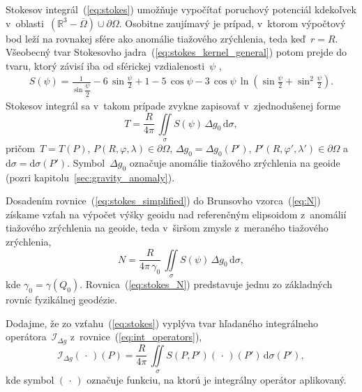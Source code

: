 \documentclass[a4paper, 12pt]{book}
\newcommand{\diff}{\mathrm d}
\begin{document}
Stokesov integrál~(\ref{eq:stokes}) umožňuje vypočítať poruchový potenciál 
kdekoľvek v~oblasti~$\left( \mathbb{R}^3 - \overline\Omega\right) \cup 
\partial\Omega$.  Osobitne zaujímavý je prípad, v~ktorom výpočtový bod leží na 
rovnakej sfére ako anomálie tiažového zrýchlenia, teda keď~$r = R$.  Všeobecný 
tvar Stokesovho jadra~(\ref{eq:stokes_kernel_general}) potom prejde do tvaru, 
ktorý závisí iba od sférickej vzdialenosti~$\psi$ 
\parencite{MoritzPhysicalGeodesy},
%
\begin{equation}
\label{eq:stokes_kernel}
\begin{split}
S(\psi) = \frac{1}{\sin\dfrac{\psi}{2}} - 6 \, \sin\frac{\psi}{2} + 1 - 5 \, 
\cos\psi - 3 \, \cos\psi \, \ln\left( \sin\frac{\psi}{2} + \sin^2\frac{\psi}{2} 
\right){.}
\end{split}
\end{equation}
%
Stokesov integrál sa v~takom prípade zvykne zapisovať v~zjednodušenej forme
%
\begin{equation}
\label{eq:stokes_simplified}
T = \frac{R}{4\pi} \, \iint\limits_{\sigma} S(\psi) \, \Delta g_0 \, \diff 
\sigma{,}
\end{equation}
%
pričom~$T = T(P)$, $P(R, \varphi, \lambda) \in \partial\Omega$, $\Delta g_0 
= \Delta g_0(P')$, $P'(R, \varphi', \lambda') \in \partial\Omega$ 
a~$\diff\sigma = \diff\sigma(P')$.  Symbol~$\Delta g_0$ označuje anomálie 
tiažového zrýchlenia na geoide (pozri kapitolu~\ref{sec:gravity_anomaly}).

Dosadením rovnice~(\ref{eq:stokes_simplified}) do Brunsovho vzorca~(\ref{eq:N}) 
získame vzťah na výpočet výšky geoidu nad referenčným elipsoidom z~anomálií 
tiažového zrýchlenia na geoide, teda v~širšom zmysle z~meraného tiažového 
zrýchlenia,
%
\begin{equation}
\label{eq:stokes_N}
N = \frac{R}{4\pi \, \gamma_0} \, \iint\limits_{\sigma} S(\psi) \, \Delta g_0 
\, \diff \sigma{,}
\end{equation}
%
kde $\gamma_0 = \gamma(Q_0)$.  Rovnica~(\ref{eq:stokes_N}) predstavuje jednu zo 
základných rovníc fyzikálnej geodézie.

Dodajme, že zo vzťahu~(\ref{eq:stokes}) vyplýva tvar hľadaného integrálneho 
operátora~$\mathcal{I}_{\Delta g}$ z~rovnice~(\ref{eq:int_operators}),
%
\begin{equation}
\label{eq:iDg}
\mathcal{I}_{\Delta g}( \, \cdot \, )(P) = \frac{R}{4\pi} \, 
\iint\limits_\sigma S(P, P') ( \, \cdot \, )(P') \, \diff\sigma(P'){,}
\end{equation}
%
kde symbol $(\, \cdot \,)$ označuje funkciu, na ktorú je integrálny operátor 
aplikovaný.
\end{document}
